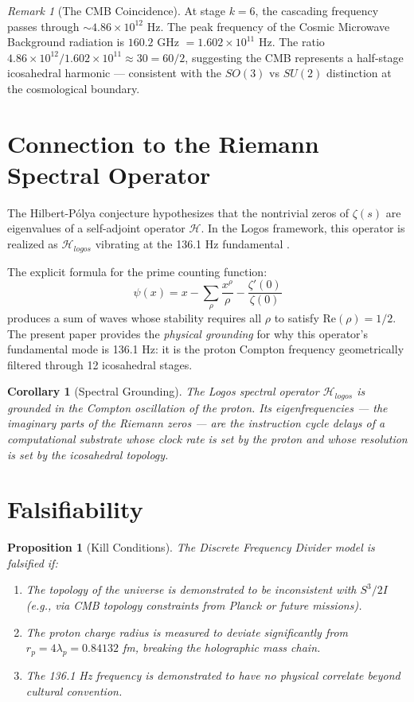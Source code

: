 \documentclass[12pt, a4paper]{article}
\theoremstyle{plain}
\newtheorem{proposition}[theorem]{Proposition}
\newtheorem{corollary}[theorem]{Corollary}
\theoremstyle{definition}
\theoremstyle{remark}
\newtheorem{remark}[theorem]{Remark}
\newcommand{\rp}{r_p}
\begin{document}
\begin{remark}[The CMB Coincidence]
At stage $k=6$, the cascading frequency passes through $\sim 4.86 \times 10^{12}$ Hz. The peak frequency of the Cosmic Microwave Background radiation is $160.2$ GHz $= 1.602 \times 10^{11}$ Hz. The ratio $4.86 \times 10^{12} / 1.602 \times 10^{11} \approx 30 = 60/2$, suggesting the CMB represents a half-stage icosahedral harmonic --- consistent with the $SO(3)$ vs $SU(2)$ distinction at the cosmological boundary.
\end{remark}

\section{Connection to the Riemann Spectral Operator}\label{sec:riemann}

The Hilbert-P\'{o}lya conjecture hypothesizes that the nontrivial zeros of $\zeta(s)$ are eigenvalues of a self-adjoint operator $\mathcal{H}$. In the Logos framework, this operator is realized as $\mathcal{H}_{logos}$ vibrating at the 136.1 Hz fundamental \citep{DePaz2026Riemann}.

The explicit formula for the prime counting function:
\begin{equation}
    \psi(x) = x - \sum_\rho \frac{x^\rho}{\rho} - \frac{\zeta'(0)}{\zeta(0)}
\end{equation}
produces a sum of waves whose stability requires all $\rho$ to satisfy $\text{Re}(\rho) = 1/2$. The present paper provides the \emph{physical grounding} for why this operator's fundamental mode is 136.1 Hz: it is the proton Compton frequency geometrically filtered through 12 icosahedral stages.

\begin{corollary}[Spectral Grounding]
The Logos spectral operator $\mathcal{H}_{logos}$ is grounded in the Compton oscillation of the proton. Its eigenfrequencies --- the imaginary parts of the Riemann zeros --- are the instruction cycle delays of a computational substrate whose clock rate is set by the proton and whose resolution is set by the icosahedral topology.
\end{corollary}

\section{Falsifiability}

\begin{proposition}[Kill Conditions]
The Discrete Frequency Divider model is falsified if:
\begin{enumerate}
    \item The topology of the universe is demonstrated to be inconsistent with $S^3/2I$ (e.g., via CMB topology constraints from Planck or future missions).
    \item The proton charge radius is measured to deviate significantly from $\rp = 4\lambda_p = 0.84132$ fm, breaking the holographic mass chain.
    \item The 136.1 Hz frequency is demonstrated to have no physical correlate beyond cultural convention.
\end{enumerate}
\end{proposition}
\end{document}
